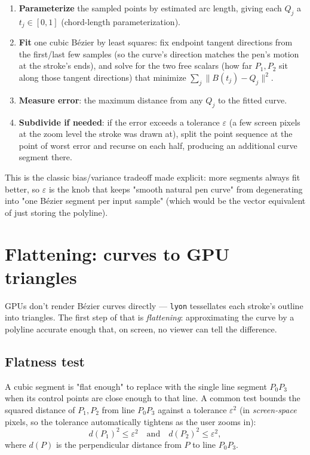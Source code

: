 \documentclass[11pt]{article}
\begin{document}
\begin{enumerate}
  \item \textbf{Parameterize} the sampled points by estimated arc length, giving each
    $Q_j$ a $t_j \in [0,1]$ (chord-length parameterization).
  \item \textbf{Fit} one cubic Bézier by least squares: fix endpoint tangent directions from
    the first/last few samples (so the curve's direction matches the pen's motion at the
    stroke's ends), and solve for the two free scalars (how far $P_1, P_2$ sit along those
    tangent directions) that minimize
    $\sum_j \lVert B(t_j) - Q_j \rVert^2$.
  \item \textbf{Measure error}: the maximum distance from any $Q_j$ to the fitted curve.
  \item \textbf{Subdivide if needed}: if the error exceeds a tolerance $\varepsilon$ (a few
    screen pixels at the zoom level the stroke was drawn at), split the point sequence at
    the point of worst error and recurse on each half, producing an additional curve
    segment there.
\end{enumerate}
This is the classic bias/variance tradeoff made explicit: more segments always fit better,
so $\varepsilon$ is the knob that keeps "smooth natural pen curve" from degenerating into
"one Bézier segment per input sample" (which would be the vector equivalent of just storing
the polyline).

\section{Flattening: curves to GPU triangles}
\label{sec:flatten}

GPUs don't render Bézier curves directly — \texttt{lyon} tessellates each stroke's outline
into triangles. The first step of that is \emph{flattening}: approximating the curve by a
polyline accurate enough that, on screen, no viewer can tell the difference.

\subsection{Flatness test}
A cubic segment is "flat enough" to replace with the single line segment $P_0 P_3$ when its
control points are close enough to that line. A common test bounds the squared distance of
$P_1, P_2$ from line $P_0P_3$ against a tolerance $\varepsilon^2$ (in \emph{screen-space}
pixels, so the tolerance automatically tightens as the user zooms in):
\begin{equation}
  d(P_1)^2 \le \varepsilon^2 \quad \text{and} \quad d(P_2)^2 \le \varepsilon^2,
\end{equation}
where $d(P)$ is the perpendicular distance from $P$ to line $P_0P_3$.
\end{document}
